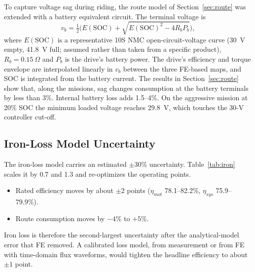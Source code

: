 \documentclass[journal]{IEEEtran}
\begin{document}
To capture voltage sag during riding, the route model of Section~\ref{sec:route}
was extended with a battery equivalent circuit. The terminal voltage is
\begin{equation}
v_b=\tfrac12\Big(E(\mathrm{SOC})+\sqrt{E(\mathrm{SOC})^2-4R_bP_b}\Big),
\label{eq:battery}
\end{equation}
where $E(\mathrm{SOC})$ is a representative 10S NMC open-circuit-voltage curve
(30~V empty, 41.8~V full; assumed rather than taken from a specific product),
$R_b=0.15~\Omega$ and $P_b$ is the drive's battery power. The drive's
efficiency and torque envelope are interpolated linearly in $v_b$ between the
three FE-based maps, and SOC is integrated from the battery current. The
results in Section~\ref{sec:route} show that, along the missions, sag changes
consumption at the battery terminals by less than 3\%. Internal battery loss
adds 1.5--4\%. On the aggressive mission at 20\% SOC the minimum loaded voltage
reaches 29.8~V, which touches the 30-V controller cut-off.

\subsection{Iron-Loss Model Uncertainty}
The iron-loss model carries an estimated $\pm$30\% uncertainty. Table~\ref{tab:iron}
scales it by 0.7 and 1.3 and re-optimizes the operating points.
\begin{itemize}
\item Rated efficiency moves by about $\pm$2 points ($\eta_{mot}$ 78.1--82.2\%,
$\eta_{sys}$ 75.9--79.9\%).
\item Route consumption moves by $-4$\% to $+5$\%.
\end{itemize}
Iron loss is therefore the second-largest uncertainty after the analytical-model
error that FE removed. A calibrated loss model, from measurement or from FE with
time-domain flux waveforms, would tighten the headline efficiency to about
$\pm1$ point.

\begin{table}[!t]
\caption{Iron-Loss Model Sensitivity (FE Characteristic, 36 V)}
\label{tab:iron}
\centering
\renewcommand{\arraystretch}{1.08}
\setlength{\tabcolsep}{3.5pt}
\end{table}
\end{document}
